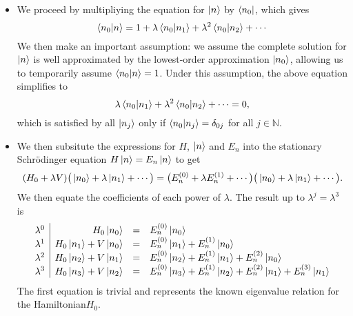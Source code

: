 \documentclass[11pt, a4paper]{article}
\newcommand{\Schro}{Schr\"{o}dinger\xspace}
\newcommand{\Ham}{Hamiltonian\xspace}
\begin{document}
\begin{itemize}
    \item We proceed by multipliying the equation for $ \ket{n} $ by $ \bra{n_{0}} $, which gives
    \begin{equation*}
        \braket{n_{0}}{n} = 1 + \lambda \braket{n_{0}}{n_{1}} + \lambda^{2}\braket{n_{0}}{n_{2}} + \cdots
    \end{equation*}
    We then make an important assumption: we assume the complete solution for $ \ket{n} $ is well approximated by the lowest-order approximation $ \ket{n_{0}} $, allowing us to temporarily assume $ \braket{n_{0}}{n} = 1 $. Under this assumption, the above equation simplifies to
    \begin{equation*}
        \lambda \braket{n_{0}}{n_{1}} + \lambda^{2}\braket{n_{0}}{n_{2}} + \cdots = 0,
    \end{equation*}
    which is satisfied by all $ \ket{n_{j}} $ only if $ \braket{n_{0}}{n_{j}} = \delta_{0j} $ for all $ j \in \mathbb{N} $.

    \item We then subsitute the expressions for $ H $, $ \ket{n} $ and $ E_{n} $ into the stationary \Schro equation $ H \ket{n} = E_{n} \ket{n} $ to get
    \begin{equation*}
        (H_{0} + \lambda V)\big( \ket{n_{0}} + \lambda \ket{n_{1}}  + \cdots \big) = \big( E_{n}^{(0)} + \lambda E_{n}^{(1)} + \cdots \big)\big( \ket{n_{0}} + \lambda \ket{n_{1}} + \cdots \big).
    \end{equation*}
    We then equate the coefficients of each power of $ \lambda $. The result up to $ \lambda^{j} = \lambda^{3} $ is
    \begin{equation*}
        \begin{array}{l|r c l}
            \lambda^{0} & H_{0} \ket{n_{0}} & = & E_{n}^{(0)} \ket{n_{0}}\\
            \lambda^{1} & H_{0}\ket{n_{1}} + V \ket{n_{0}} & = & E_{n}^{(0)}\ket{n_{1}} + E_{n}^{(1)}\ket{n_{0}}\\
            \lambda^{2} & H_{0}\ket{n_{2}} + V \ket{n_{1}} & = & E_{n}^{(0)}\ket{n_{2}} + E_{n}^{(1)}\ket{n_{1}} + E_{n}^{(2)}\ket{n_{0}}\\
            \lambda^{3} & H_{0}\ket{n_{3}} + V \ket{n_{2}} & = & E_{n}^{(0)}\ket{n_{3}} + E_{n}^{(1)}\ket{n_{2}} + E_{n}^{(2)}\ket{n_{1}} + E_{n}^{(3)}\ket{n_{1}}
        \end{array}
    \end{equation*}
    The first equation is trivial and represents the known eigenvalue relation for the \Ham $ H_{0} $. 


\end{itemize}
\end{document}
